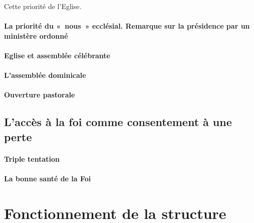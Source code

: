 Cette priorité de l'Eglise.

\hypertarget{la-priorituxe9-du-nous-eccluxe9sial.-remarque-sur-la-pruxe9sidence-par-un-ministuxe8re-ordonnuxe9}{%
\paragraph{La priorité du «~nous~» ecclésial. Remarque sur la
présidence par un ministère
ordonné}\label{la-priorituxe9-du-nous-eccluxe9sial.-remarque-sur-la-pruxe9sidence-par-un-ministuxe8re-ordonnuxe9}}



\hypertarget{eglise-et-assembluxe9e-cuxe9luxe9brante}{%
\paragraph{Eglise et assemblée
célébrante}\label{eglise-et-assembluxe9e-cuxe9luxe9brante}}

\hypertarget{lassembluxe9e-dominicale}{%
\paragraph{L'assemblée
dominicale}\label{lassembluxe9e-dominicale}}

\hypertarget{ouverture-pastorale}{%
\paragraph{Ouverture pastorale}\label{ouverture-pastorale}}

\hypertarget{laccuxe8s-uxe0-la-foi-comme-consentement-uxe0-une-perte}{%
\subsection{L'accès à la foi comme consentement à une
perte}\label{laccuxe8s-uxe0-la-foi-comme-consentement-uxe0-une-perte}}

\hypertarget{triple-tentation}{%
\paragraph{Triple tentation}\label{triple-tentation}}

\hypertarget{la-bonne-santuxe9-e-la-foi}{%
\paragraph{La bonne santé de la
Foi}\label{la-bonne-santuxe9-e-la-foi}}

\hypertarget{ii.-fonctionnement-de-la-structure}{%
\section{ Fonctionnement de la
structure}\label{ii.-fonctionnement-de-la-structure}}

